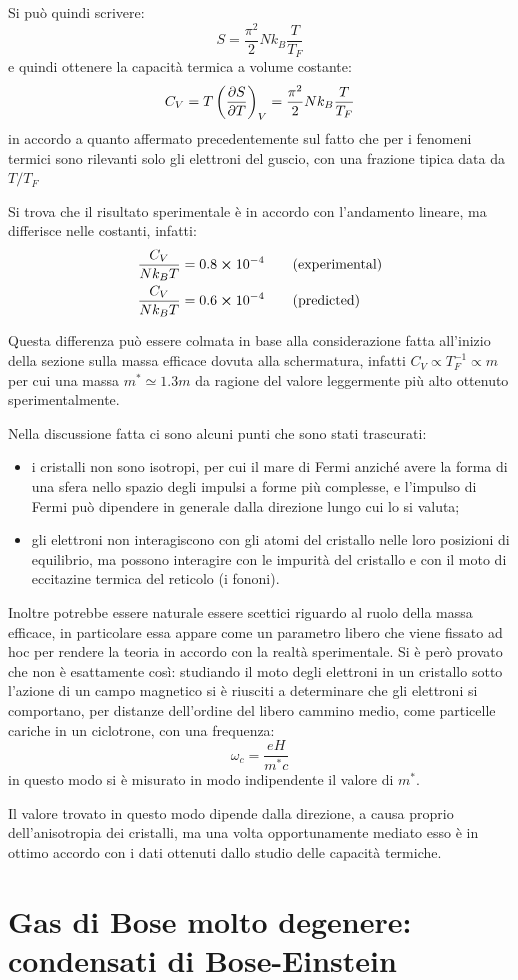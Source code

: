 Si può quindi scrivere:
\begin{equation*}
S = \frac{\pi^2}{2} N k_B \frac{T}{T_F}
\end{equation*}
e quindi ottenere la capacità termica a volume costante:
\begin{equation*}
C_V = T \left(\frac{\partial {S}}{\partial {T}}\right)_{V} = \frac{\pi^2}{2} N k_B \frac{T}{T_F}
\end{equation*}
in accordo a quanto affermato precedentemente sul fatto che per i fenomeni termici sono rilevanti solo gli elettroni del guscio, con una frazione tipica data da $T/T_F$

Si trova che il risultato sperimentale è in accordo con l'andamento lineare, ma differisce nelle costanti, infatti:
\begin{align*}
\frac{C_V}{N k_B T} &= 0.8 \cross 10^{-4} \qquad (\text{experimental})\\
\frac{C_V}{N k_B T} &= 0.6 \cross 10^{-4} \qquad (\text{predicted})
\end{align*}

Questa differenza può essere colmata in base alla considerazione fatta all'inizio della sezione sulla massa efficace dovuta alla schermatura, infatti $C_V \propto T_F^{-1} \propto m$ per cui una massa $m^\ast \simeq 1.3 m$ da ragione del valore leggermente più alto ottenuto sperimentalmente.
\newline

Nella discussione fatta ci sono alcuni punti che sono stati trascurati:
\begin{itemize}
	\item i cristalli non sono isotropi, per cui il mare di Fermi anziché avere la forma di una sfera nello spazio degli impulsi a forme più complesse, e l'impulso di Fermi può dipendere in generale dalla direzione lungo cui lo si valuta;
	\item gli elettroni non interagiscono con gli atomi del cristallo nelle loro posizioni di equilibrio, ma possono interagire con le impurità del cristallo e con il moto di eccitazine termica del reticolo (i fononi).
\end{itemize}
Inoltre potrebbe essere naturale essere scettici riguardo al ruolo della massa efficace, in particolare essa appare come un parametro libero che viene fissato ad hoc per rendere la teoria in accordo con la realtà sperimentale.
Si è però provato che non è esattamente così: studiando il moto degli elettroni in un cristallo sotto l'azione di un campo magnetico si è riusciti a determinare che gli elettroni si comportano, per distanze dell'ordine del libero cammino medio, come particelle cariche in un ciclotrone, con una frequenza:
\begin{equation*}
\omega_c = \frac{e H}{m^\ast c}
\end{equation*}
in questo modo si è misurato in modo indipendente il valore di $m^\ast$.

Il valore trovato in questo modo dipende dalla direzione, a causa proprio dell'anisotropia dei cristalli, ma una volta opportunamente mediato esso è in ottimo accordo con i dati ottenuti dallo studio delle capacità termiche.

\section{Gas di Bose molto degenere: condensati di Bose-Einstein}